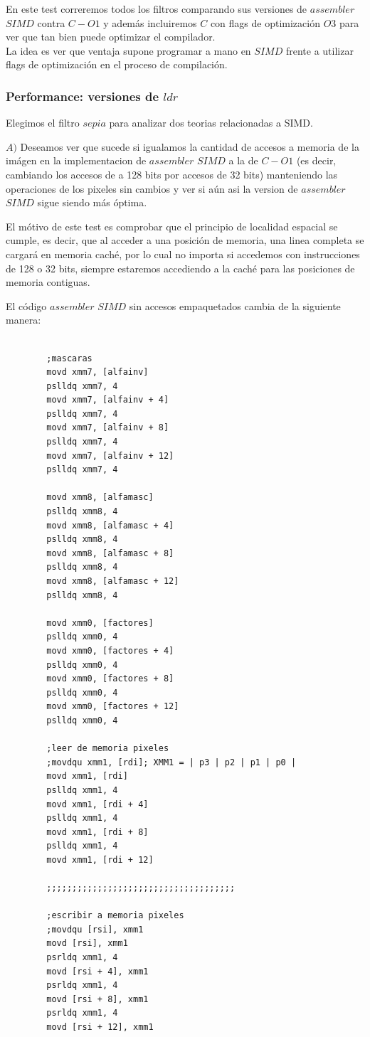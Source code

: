 En este test correremos todos los filtros comparando sus versiones de $assembler$ $SIMD$ contra $C-O1$ y además incluiremos $C$ con flags de optimización $O3$ para ver que tan bien puede optimizar el compilador. \\
La idea es ver que ventaja supone programar a mano en $SIMD$ frente a utilizar flags de optimización en el proceso de compilación.\\ 

\subsubsection{Performance: versiones de $ldr$}

Elegimos el filtro $sepia$ para analizar dos teorias relacionadas a SIMD. 

$A)$ Deseamos ver que sucede si igualamos la cantidad de accesos a memoria de la imágen en la implementacion de $assembler$ $SIMD$ a la de $C-O1$ (es decir, cambiando los accesos de a 128 bits por accesos de 32 bits) manteniendo las operaciones de los pixeles sin cambios  y ver si aún asi la version de $assembler$ $SIMD$ sigue siendo más óptima.

El mótivo de este test es comprobar que el principio de localidad espacial se cumple, es decir, que al acceder a una posición de memoria, una linea completa se cargará en memoria caché, por lo cual no importa si accedemos con instrucciones de 128 o 32 bits, siempre estaremos accediendo a la caché para las posiciones de memoria contiguas.

El código $assembler$ $SIMD$ sin accesos empaquetados cambia de la siguiente manera:

\begin{codesnippet}
\begin{verbatim}

		;mascaras
		movd xmm7, [alfainv]
 	    pslldq xmm7, 4
	    movd xmm7, [alfainv + 4]
	    pslldq xmm7, 4
	    movd xmm7, [alfainv + 8]
	    pslldq xmm7, 4
	    movd xmm7, [alfainv + 12]
	    pslldq xmm7, 4

	    movd xmm8, [alfamasc]
	    pslldq xmm8, 4
	    movd xmm8, [alfamasc + 4]
	    pslldq xmm8, 4
	    movd xmm8, [alfamasc + 8]
	    pslldq xmm8, 4
	    movd xmm8, [alfamasc + 12]
	    pslldq xmm8, 4

	    movd xmm0, [factores]
	    pslldq xmm0, 4
	    movd xmm0, [factores + 4]
	    pslldq xmm0, 4
	    movd xmm0, [factores + 8]
	    pslldq xmm0, 4
	    movd xmm0, [factores + 12]
	    pslldq xmm0, 4

		;leer de memoria pixeles
		;movdqu xmm1, [rdi]; XMM1 = | p3 | p2 | p1 | p0 |
		movd xmm1, [rdi]
		pslldq xmm1, 4
		movd xmm1, [rdi + 4]
		pslldq xmm1, 4
		movd xmm1, [rdi + 8]
		pslldq xmm1, 4
		movd xmm1, [rdi + 12]	
		
		;;;;;;;;;;;;;;;;;;;;;;;;;;;;;;;;;;;;;
		
		;escribir a memoria pixeles
		;movdqu [rsi], xmm1
		movd [rsi], xmm1
		psrldq xmm1, 4
		movd [rsi + 4], xmm1
		psrldq xmm1, 4
		movd [rsi + 8], xmm1
		psrldq xmm1, 4
		movd [rsi + 12], xmm1

\end{verbatim}
\end{codesnippet}

